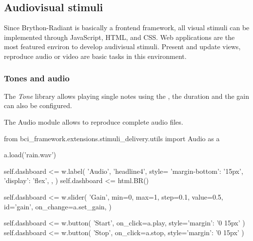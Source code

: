 \subsection{Audiovisual stimuli}

Since Brython-Radiant is basically a frontend framework, all visual stimuli can be implemented through JavaScript, HTML, and CSS. Web applications are the most featured environ to develop audivisual stimuli. Present and update views, reproduce audio or video are basic tasks in this environment. 

\subsubsection{Tones and audio}

The \textit{Tone} library allows playing single notes using the  , the duration and the gain can also be configured.

The Audio module allows to reproduce complete audio files.
\begin{python}
from bci_framework.extensions.stimuli_delivery.utils import Audio as a

a.load('rain.wav')

self.dashboard <= w.label(
    'Audio',
    'headline4',
    style={
        'margin-bottom': '15px',
        'display': 'flex',
    },
)
self.dashboard <= html.BR()

self.dashboard <= w.slider(
    'Gain',
    min=0,
    max=1,
    step=0.1,
    value=0.5,
    id='gain',
    on_change=a.set_gain,
)

self.dashboard <= w.button(
    'Start', on_click=a.play, style={'margin': '0 15px'}
)
self.dashboard <= w.button(
    'Stop', on_click=a.stop, style={'margin': '0 15px'}
)

\end{python}


